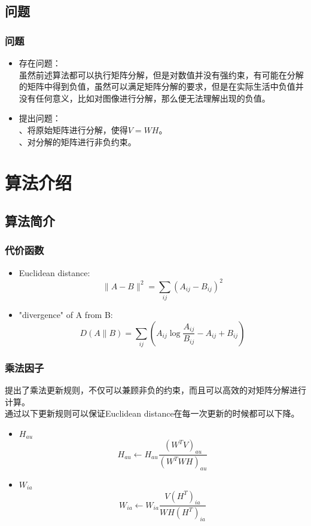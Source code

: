 \documentclass[UTF8,mathserif]{beamer}
\begin{document}
\subsection{问题}

\begin{frame}
    \frametitle{问题}
    \begin{itemize}
        \item 存在问题：\\
            \quad \quad 虽然前述算法都可以执行矩阵分解，但是对数值并没有强约束，有可能在分解的矩阵中得到负值，虽然可以满足矩阵分解的要求，但是在实际生活中负值并没有任何意义，比如对图像进行分解，那么便无法理解出现的负值。
        \item 提出问题：\\
            \quad {}、将原始矩阵进行分解，使得$V=WH$。\\
            \quad {}、对分解的矩阵进行非负约束。
    \end{itemize}
\end{frame}



\section{算法介绍}

\subsection{算法简介}

\begin{frame}
\frametitle{代价函数}
    \begin{itemize}
        \item Euclidean distance:\\
            $$\|A-B\|^{2}=\sum_{ij}(A_{ij}-B_{ij})^{2}$$
        \item  "divergence" of A from B:\\
            $$D(A\|B)=\sum_{ij}(A_{ij}\log\frac{A_{ij}}{B_{ij}}-A_{ij}+B_{ij})$$
    \end{itemize}
\end{frame}


\begin{frame}
\frametitle{乘法因子}
    \indent 提出了乘法更新规则，不仅可以兼顾非负的约束，而且可以高效的对矩阵分解进行计算。\\
    \indent 通过以下更新规则可以保证Euclidean distance在每一次更新的时候都可以下降。 \\
    \begin{itemize}
        \item $H_{au}$\\
            $$H_{au}\leftarrow H_{au}\frac{(W^{T}V)_{au}}{(W^{T}WH)_{au}}$$
        \item $W_{ia}$\\
            $$W_{ia}\leftarrow W_{ia}\frac{V(H^{T})_{ia}}{WH(H^{T})_{ia}}$$
    \end{itemize}
\end{frame}
\end{document}
